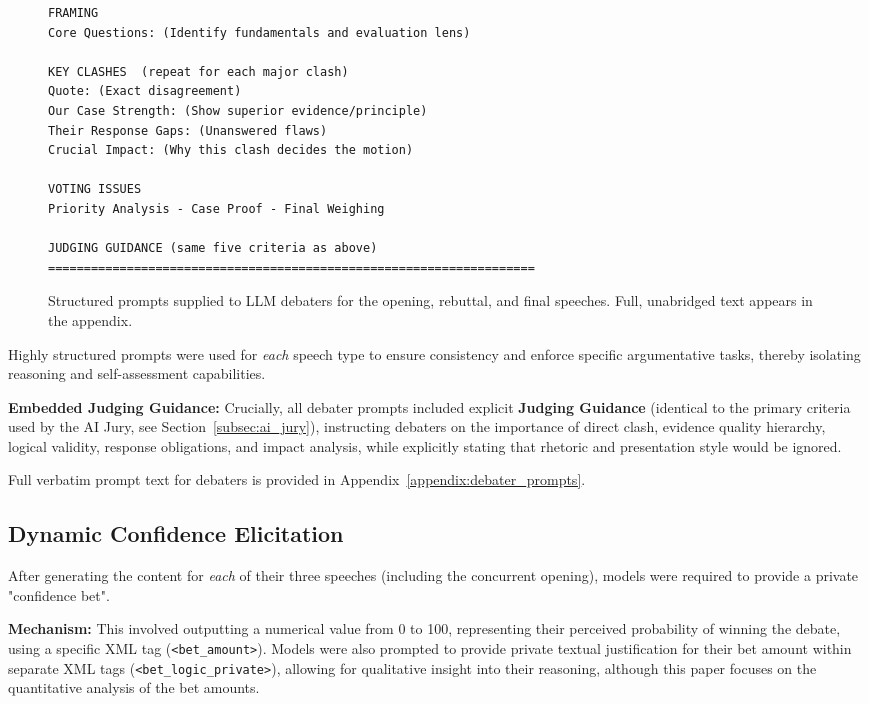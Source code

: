 \documentclass{article}
\begin{document}
\begin{figure}[htbp]
\begin{adjustbox}{max height=0.88\textheight}
\begin{lstlisting}[language={}]
FRAMING
Core Questions: (Identify fundamentals and evaluation lens)

KEY CLASHES  (repeat for each major clash)
Quote: (Exact disagreement)
Our Case Strength: (Show superior evidence/principle)
Their Response Gaps: (Unanswered flaws)
Crucial Impact: (Why this clash decides the motion)

VOTING ISSUES
Priority Analysis - Case Proof - Final Weighing

JUDGING GUIDANCE (same five criteria as above)
====================================================================
  \end{lstlisting}
  \end{adjustbox}

  \caption{Structured prompts supplied to LLM debaters for the opening, rebuttal,
  and final speeches.  Full, unabridged text appears in the appendix.}
  \label{fig:prompts}
\end{figure}


Highly structured prompts were used for \textit{each} speech type to ensure consistency and enforce specific argumentative tasks, thereby isolating reasoning and self-assessment capabilities.

\textbf{Embedded Judging Guidance:} Crucially, all debater prompts included explicit \textbf{Judging Guidance} (identical to the primary criteria used by the AI Jury, see Section~\ref{subsec:ai_jury}), instructing debaters on the importance of direct clash, evidence quality hierarchy, logical validity, response obligations, and impact analysis, while explicitly stating that rhetoric and presentation style would be ignored.

Full verbatim prompt text for debaters is provided in Appendix~\ref{appendix:debater_prompts}.

\subsection{Dynamic Confidence Elicitation}
\label{subsec:confidence_elicitation}

After generating the content for \textit{each} of their three speeches (including the concurrent opening), models were required to provide a private "confidence bet".

\textbf{Mechanism:} This involved outputting a numerical value from 0 to 100, representing their perceived probability of winning the debate, using a specific XML tag (\texttt{<bet\_amount>}).
Models were also prompted to provide private textual justification for their bet amount within separate XML tags (\texttt{<bet\_logic\_private>}), allowing for qualitative insight into their reasoning, although this paper focuses on the quantitative analysis of the bet amounts.
\end{document}
